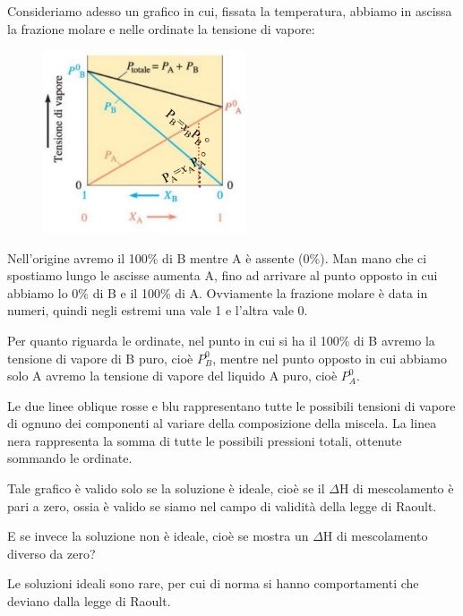 Consideriamo adesso un grafico in cui, fissata la temperatura, abbiamo in ascissa la frazione molare e nelle ordinate la tensione di vapore:

\begin{minipage}{0.4\textwidth}
    \begin{figure}[H]
        \includegraphics[width=6cm]{immagini/tensione_di_vapore_sol_ideale.png}
    \end{figure}
\end{minipage}
\begin{minipage}{0.6\textwidth}
    Nell'origine avremo il 100\% di B mentre A è assente (0\%). Man mano che ci spostiamo lungo le ascisse aumenta A, fino ad arrivare al punto opposto in cui abbiamo lo 0\% di B e il 100\% di A. Ovviamente la frazione molare è data in numeri, quindi negli estremi una vale 1 e l'altra vale 0.

    Per quanto riguarda le ordinate, nel punto in cui si ha il 100\% di B avremo la tensione di vapore di B puro, cioè $P^0_B$, mentre nel punto opposto in cui abbiamo solo A avremo la tensione di vapore del liquido A puro, cioè $P^0_A$.
\end{minipage}

Le due linee oblique rosse e blu rappresentano tutte le possibili tensioni di vapore di ognuno dei componenti al variare della composizione della miscela. La linea nera rappresenta la somma di tutte le possibili pressioni totali, ottenute sommando le ordinate.

Tale grafico è valido solo se la soluzione è ideale, cioè se il $\Delta$H di mescolamento è pari a zero, ossia è valido se siamo nel campo di validità della legge di Raoult.

\vspace{0.2cm}E se invece la soluzione non è ideale, cioè se mostra un $\Delta$H di mescolamento diverso da zero?

Le soluzioni ideali sono rare, per cui di norma si hanno comportamenti che deviano dalla legge di Raoult.

